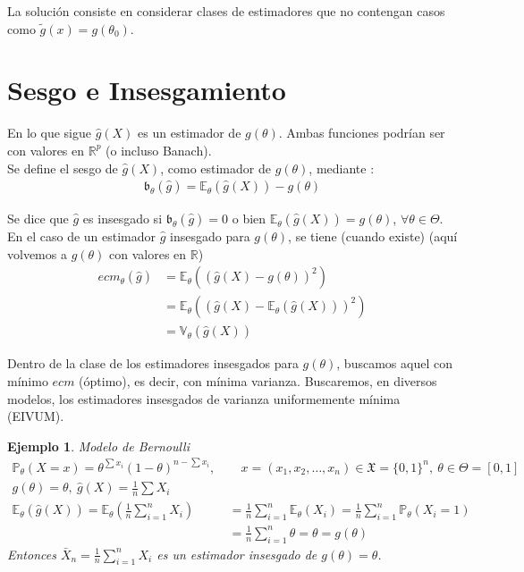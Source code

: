 \documentclass[10pt]{article}
\theoremstyle{plain}
\newtheorem{ej}{Ejemplo}
\theoremstyle{definition}
\begin{document}
La solución consiste en considerar clases de estimadores que no contengan casos como $\tilde{g}(x) = g(\theta_{0})$.

\section{Sesgo e Insesgamiento}
En lo que sigue $\hat{g}(X)$ es un estimador de $g(\theta)$. Ambas funciones podrían ser con valores en $\mathbb{R}^p$ (o incluso Banach).\\
Se define el sesgo de $\hat{g}(X)$, como estimador de $g(\theta)$, mediante :
\begin{align*}
\mathfrak{b}_{\theta}(\hat{g}) = \mathbb{E}_{\theta}(\hat{g}(X)) - g(\theta)
\end{align*}

Se dice que $\hat{g}$ es insesgado si $\mathfrak{b}_{\theta}(\hat{g}) = 0$ o bien $\mathbb{E}_{\theta}(\hat{g}(X)) = g(\theta)$, $\forall \theta \in \Theta$.\\

En el caso de un estimador $\hat{g}$ insesgado para $g(\theta)$, se tiene (cuando existe) (aquí volvemos a $g(\theta)$ con valores en $\mathbb{R}$)
\begin{align*}
ecm_{\theta}(\hat{g}) &= \mathbb{E}_{\theta}((\hat{g}(X)-g(\theta))^2)\\
&= \mathbb{E}_{\theta}((\hat{g}(X)-\mathbb{E}_{\theta}(\hat{g}(X)))^2)\\
&= \mathbb{V}_{\theta}(\hat{g}(X))
\end{align*}

Dentro de la clase de los estimadores insesgados para $g(\theta)$, buscamos aquel con mínimo $ecm$ (óptimo), es decir, con mínima varianza. Buscaremos, en diversos modelos, los estimadores insesgados de varianza uniformemente mínima (EIVUM).

\begin{ej} Modelo de Bernoulli \\
\begin{align*}
\mathbb{P}_{\theta}(X=x) = \theta^{\sum{x_{i}}}(1-\theta)^{n-\sum{x_{i}}},\ &\quad x = (x_{1}, x_{2}, \ldots, x_{n}) \in \mathfrak{X}=\{0,1\}^n,\ \theta \in \Theta = \left[0,1\right]\\
g(\theta) = \theta,\ \hat{g}(X) = \frac{1}{n}\sum{X_{i}}\\
\mathbb{E}_{\theta}(\hat{g}(X)) = \mathbb{E}_{\theta}\left(\frac{1}{n}\sum_{i=1}^n{X_{i}}\right) &= \frac{1}{n}\sum_{i=1}^n\mathbb{E}_{\theta}(X_{i})= \frac{1}{n}\sum_{i=1}^n\mathbb{P}_{\theta}(X_{i} = 1)\\
&= \frac{1}{n}\sum_{i=1}^n\theta = \theta = g(\theta)
\end{align*}
Entonces $\bar{X}_{n} = \frac{1}{n}\sum_{i=1}^nX_{i}$ es un estimador insesgado de $g(\theta) = \theta$.
\end{ej}
\end{document}
